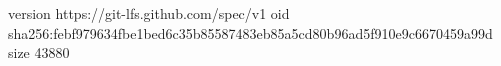 version https://git-lfs.github.com/spec/v1
oid sha256:febf979634fbe1bed6c35b85587483eb85a5cd80b96ad5f910e9c6670459a99d
size 43880
